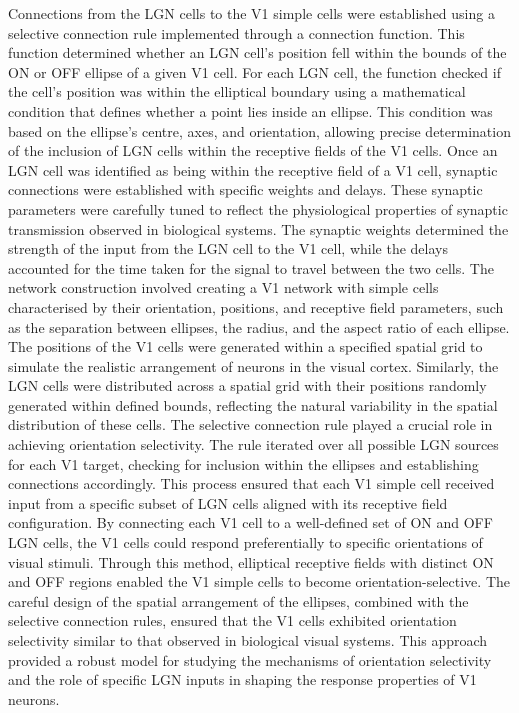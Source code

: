 \documentclass[12pt]{article}
\begin{document}
Connections from the LGN cells to the V1 simple cells were established using a selective connection rule implemented through a connection function. This function determined whether an LGN cell's position fell within the bounds of the ON or OFF ellipse of a given V1 cell. For each LGN cell, the function checked if the cell's position was within the elliptical boundary using a mathematical condition that defines whether a point lies inside an ellipse. This condition was based on the ellipse's centre, axes, and orientation, allowing precise determination of the inclusion of LGN cells within the receptive fields of the V1 cells. Once an LGN cell was identified as being within the receptive field of a V1 cell, synaptic connections were established with specific weights and delays. These synaptic parameters were carefully tuned to reflect the physiological properties of synaptic transmission observed in biological systems. The synaptic weights determined the strength of the input from the LGN cell to the V1 cell, while the delays accounted for the time taken for the signal to travel between the two cells. The network construction involved creating a V1 network with simple cells characterised by their orientation, positions, and receptive field parameters, such as the separation between ellipses, the radius, and the aspect ratio of each ellipse. The positions of the V1 cells were generated within a specified spatial grid to simulate the realistic arrangement of neurons in the visual cortex. Similarly, the LGN cells were distributed across a spatial grid with their positions randomly generated within defined bounds, reflecting the natural variability in the spatial distribution of these cells. The selective connection rule played a crucial role in achieving orientation selectivity. The rule iterated over all possible LGN sources for each V1 target, checking for inclusion within the ellipses and establishing connections accordingly. This process ensured that each V1 simple cell received input from a specific subset of LGN cells aligned with its receptive field configuration. By connecting each V1 cell to a well-defined set of ON and OFF LGN cells, the V1 cells could respond preferentially to specific orientations of visual stimuli. Through this method, elliptical receptive fields with distinct ON and OFF regions enabled the V1 simple cells to become orientation-selective. The careful design of the spatial arrangement of the ellipses, combined with the selective connection rules, ensured that the V1 cells exhibited orientation selectivity similar to that observed in biological visual systems. This approach provided a robust model for studying the mechanisms of orientation selectivity and the role of specific LGN inputs in shaping the response properties of V1 neurons.
\end{document}
